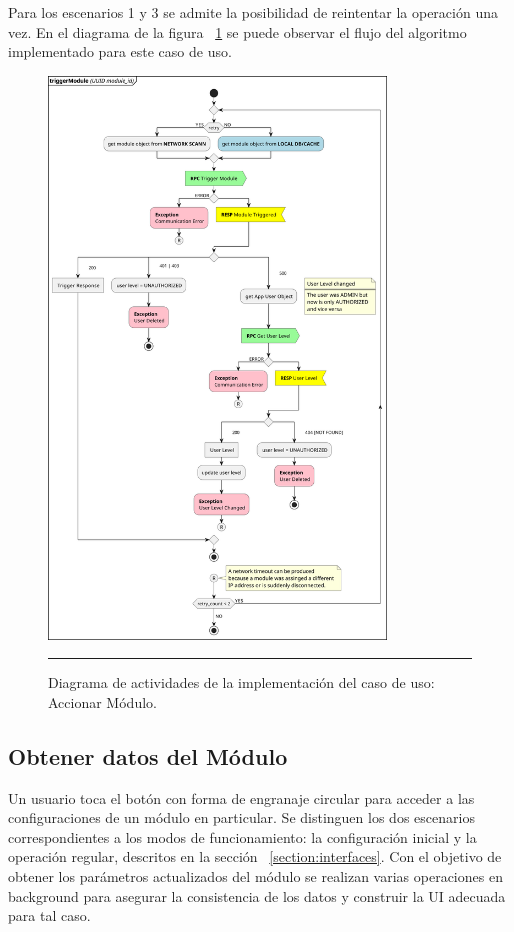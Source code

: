 Para los escenarios 1 y 3 se admite la posibilidad de reintentar la operación una vez.
En el diagrama de la figura ~\ref{fig:act_trigger} se puede observar el flujo del algoritmo implementado para este caso de uso.

\begin{figure}[htbp]
	\centering
	\includegraphics[width=0.8\textwidth]{Figures/iter1/ACT_trigger_module.png}
	\rule{35em}{1pt}
	\caption[Actividades Accionar Módulo]{Diagrama de actividades de la implementación del caso de uso: Accionar Módulo.}
	\label{fig:act_trigger}
\end{figure}

\subsection{Obtener datos del Módulo}
Un usuario toca el botón con forma de engranaje circular para acceder a las configuraciones de un módulo en particular.
Se distinguen los dos escenarios correspondientes a los modos de funcionamiento: la configuración inicial y la operación regular, descritos en la sección ~\ref{section:interfaces}.
Con el objetivo de obtener los parámetros actualizados del módulo se realizan varias operaciones en background para asegurar la consistencia de los datos y construir la UI adecuada para tal caso.

